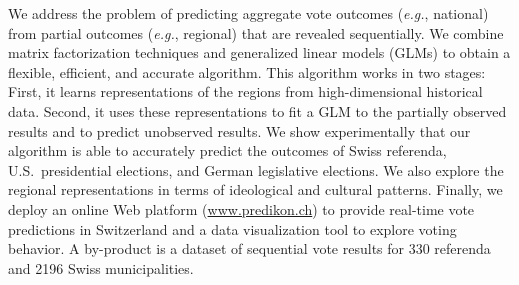 
We address the problem of predicting aggregate vote outcomes (\textit{e.g.}, national) from partial outcomes (\textit{e.g.}, regional) that are revealed sequentially.
We combine matrix factorization techniques and generalized linear models (GLMs) to obtain a flexible, efficient, and accurate algorithm.
This algorithm works in two stages:
First, it learns representations of the regions from high-dimensional historical data.
Second, it uses these representations to fit a GLM to the partially observed results and to predict unobserved results.
We show experimentally that our algorithm is able to accurately predict the outcomes of Swiss referenda, U.S.\ presidential elections, and German legislative elections.
We also explore the regional representations in terms of ideological and cultural patterns.
Finally, we deploy an online Web platform (\href{http://www.predikon.ch}{www.predikon.ch}) to provide real-time vote predictions in Switzerland and a data visualization tool to explore voting behavior.
A by-product is a dataset of sequential vote results for 330 referenda and 2196 Swiss municipalities.

